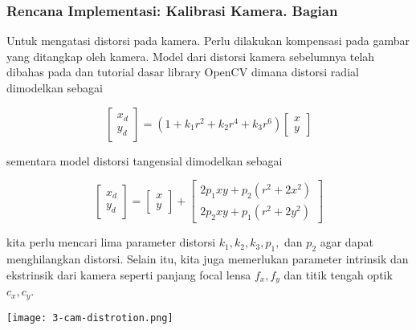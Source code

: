 \begin{frame}[allowframebreaks]
    \frametitle{Rencana Implementasi: Kalibrasi Kamera. Bagian}

    Untuk mengatasi distorsi pada kamera. Perlu dilakukan kompensasi pada gambar yang ditangkap oleh kamera. Model dari distorsi kamera sebelumnya telah dibahas pada \cite{richardsz2021cv} dan tutorial dasar library OpenCV dimana distorsi radial dimodelkan sebagai

    \begin{equation}
        \left[\begin{array}{l}
        x_{d} \\
        y_{d}
        \end{array}\right]=\left(1+k_{1} r^{2}+k_{2} r^{4}+k_{3} r^{6}\right)\left[\begin{array}{l}
        x \\
        y
        \end{array}\right]
    \end{equation}

    sementara model distorsi tangensial dimodelkan sebagai

    \begin{equation}
        \left[\begin{array}{l}
        x_{d} \\
        y_{d}
        \end{array}\right]=\left[\begin{array}{l}
        x \\
        y
        \end{array}\right]+\left[\begin{array}{l}
        2 p_{1} x y+p_{2}\left(r^{2}+2 x^{2}\right) \\
        2 p_{2} x y+p_{1}\left(r^{2}+2 y^{2}\right)
        \end{array}\right]
    \end{equation}

    kita perlu mencari lima parameter distorsi $k_1, k_2, k_3, p_1,$ dan $p_2$ agar dapat menghilangkan distorsi. Selain itu, kita juga memerlukan parameter intrinsik dan ekstrinsik dari kamera seperti panjang focal lensa $f_x, f_y$ dan titik tengah optik $c_x, c_y$.

    \begin{center}
        \texttt{[image: 3-cam-distrotion.png]}        
    \end{center}
\end{frame}


